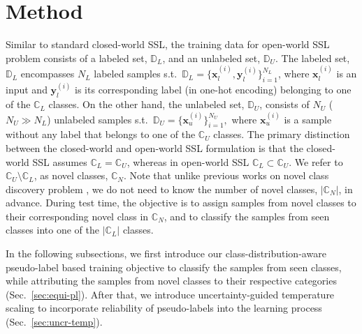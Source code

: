 \documentclass[runningheads]{eccv2022submission}
\begin{document}
  
\vspace{-2mm}
\section{Method}
\vspace{-2mm}

Similar to standard closed-world SSL, the training data for open-world SSL problem consists of a labeled set, $\mathbb{D}_L$, and an unlabeled set, $\mathbb{D}_U$. The labeled set, $\mathbb{D}_L$ encompasses $N_L$ labeled samples s.t.\ $\mathbb{D}_L = \big\{\mathbf{x}^{(i)}_l, {\mathbf{y}}^{(i)}_l\big\}_{i=1}^{N_L}$, where $\mathbf{x}^{(i)}_l$ is an input and ${\mathbf{y}}^{(i)}_l$ is its corresponding label (in one-hot encoding) belonging to one of the $\mathbb{C}_L$ classes. On the other hand, the unlabeled set, $\mathbb{D}_U$, consists of $N_U$ ( $N_U\gg N_L$) unlabeled samples s.t.\ $\mathbb{D}_U=\big\{\mathbf{x}^{(i)}_u\big\}_{i=1}^{N_U},$ where $\mathbf{x}^{(i)}_u$ is a sample without any label that belongs to one of the $\mathbb{C}_U$ classes. The primary distinction between the closed-world and open-world SSL formulation is that the closed-world SSL assumes $\mathbb{C}_L = \mathbb{C}_U$, whereas in open-world SSL $\mathbb{C}_L \subset \mathbb{C}_U$. We refer to $\mathbb{C}_U\setminus \mathbb{C}_L$, as novel classes, $\mathbb{C}_N$. Note that unlike previous works on novel class discovery problem \cite{Han2020Automatically,fini2021unified,Zhong_2021_CVPR}, we do not need to know the number of novel classes, $|\mathbb{C}_N|$, in advance. During test time, the objective is to assign samples from novel classes to their corresponding novel class in $\mathbb{C}_N$, and to classify the samples from seen classes into one of the $|\mathbb{C}_L|$ classes.

In the following subsections, we first introduce our class-distribution-aware pseudo-label based training objective to classify the samples from seen classes, while attributing the samples from novel classes to their respective categories (Sec.~\ref{sec:equi-pl}). After that, we introduce uncertainty-guided temperature scaling to incorporate reliability of pseudo-labels into the learning process (Sec.~\ref{sec:uncr-temp}). 
\end{document}
